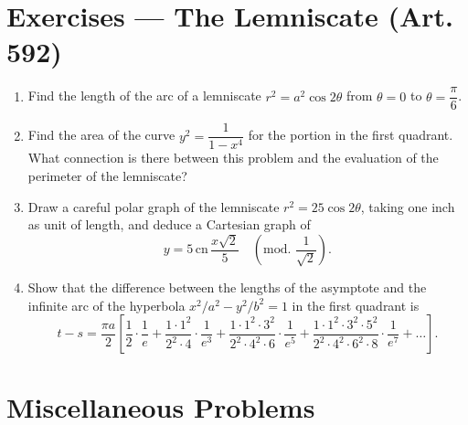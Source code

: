 \documentclass[11pt, a4paper]{article}
\begin{document}
\section*{Exercises --- The Lemniscate (Art. 592)}

\begin{enumerate}[leftmargin=2em]

\item Find the length of the arc of a lemniscate $r^2=a^2\cos2\theta$ from $\theta=0$ to $\theta=\dfrac{\pi}{6}$.

\item Find the area of the curve $y^2=\dfrac{1}{1-x^4}$ for the portion in the first quadrant. What connection is there between this problem and the evaluation of the perimeter of the lemniscate?

\item Draw a careful polar graph of the lemniscate $r^2=25\cos2\theta$, taking one inch as unit of length, and deduce a Cartesian graph of
\[
y=5\,\mathrm{cn}\,\frac{x\sqrt2}{5}\quad\left(\text{mod. }\frac{1}{\sqrt2}\right).
\]

\item Show that the difference between the lengths of the asymptote and the infinite arc of the hyperbola $x^2/a^2-y^2/b^2=1$ in the first quadrant is
\[
t-s=\frac{\pi a}{2}\left[\frac12\cdot\frac{1}{e}+\frac{1\cdot1^2}{2^2\cdot4}\cdot\frac{1}{e^3}+\frac{1\cdot1^2\cdot3^2}{2^2\cdot4^2\cdot6}\cdot\frac{1}{e^5}+\frac{1\cdot1^2\cdot3^2\cdot5^2}{2^2\cdot4^2\cdot6^2\cdot8}\cdot\frac{1}{e^7}+\dots\right].
\]

\end{enumerate}

\section*{Miscellaneous Problems}
\end{document}
